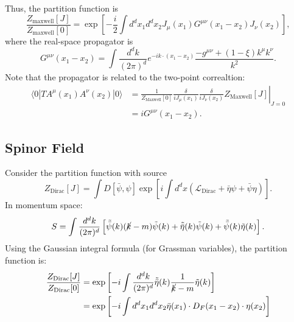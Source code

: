 Thus, the partition function is
\begin{equation}
	\frac{Z_{\mathrm{maxwell}}[J]}{Z_{\mathrm{maxwell}}[0]}
	= \exp\left[-\frac{i}{2}\int d^dx_1 d^dx_2 J_\mu(x_1) G^{\mu\nu}(x_1-x_2) J_\nu(x_2) \right],
\end{equation}
where the real-space propagator is
\begin{equation}
	G^{\mu\nu}(x_1-x_2) = \int \frac{d^d k}{(2\pi)^d} e^{-ik\cdot(x_1-x_2)}\frac{-g^{\mu\nu}+(1-\xi)k^\mu k^\nu}{k^2}.
\end{equation}
Note that the propagator is related to the two-point correaltion:
\begin{equation}
\begin{aligned}
	\langle 0|T A^\mu(x_1) A^\nu(x_2) |0\rangle
	&= \left.\frac{1}{Z_{\mathrm{Maxwell}}[0]}\frac{\delta}{iJ_\mu(x_1)}\frac{\delta}{iJ_\nu(x_2)} Z_{\mathrm{Maxwell}}[J]\right|_{J=0} \\
	&= iG^{\mu\nu}(x_1-x_2).
\end{aligned}
\end{equation}


\subsection{Spinor Field}
Consider the partition function with source
\begin{equation}
	Z_{\mathrm{Dirac}}[J]
	= \int D[\bar\psi,\psi] \exp\left[i\int d^dx \left(\mathcal{L}_{\mathrm{Dirac}}+\bar{\eta}\psi + \bar\psi\eta \right) \right].
\end{equation}
In momentum space:
\begin{equation}
	S = \int\frac{d^d k}{(2\pi)^d} \left[
		\tilde{\bar\psi}(k)(\cancel{k}-m)\tilde{\psi}(k) +
		\tilde{\bar\eta}(k) \tilde{\psi}(k) +
		\tilde{\bar\psi}(k) \tilde{\eta}(k)
	\right].
\end{equation}
Using the Gaussian integral formula (for Grassman variables), the partition function is:
\begin{equation}
\begin{aligned}
	\frac{Z_{\mathrm{Dirac}}[J]}{Z_{\mathrm{Dirac}}[0]}
	&= \exp\left[-i\int \frac{d^d k}{(2\pi)^d} \tilde{\bar\eta}(k)\frac{1}{\cancel{k}-m}\tilde\eta(k)\right] \\
	&= \exp\left[-i\int d^dx_1 d^d x_2 \bar{\eta}(x_1)\cdot D_F(x_1-x_2)\cdot \eta(x_2) \right]
\end{aligned}
\end{equation}

